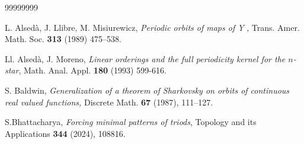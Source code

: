 \documentclass[12pt,reqno]{amsart}
\theoremstyle{definition}
\theoremstyle{remark}
\theoremstyle{assumption}
\numberwithin{equation}{section}
\begin{document}
	\begin{thebibliography}{99999999}
	
	
	 L. Alsedà, J. Llibre, M. Misiurewicz, \emph{Periodic orbits of maps of Y} , Trans. Amer. Math. Soc. \textbf{313} (1989) 475–538.
	
	
	
	
	

	  Ll. Alsed\`{a}, J. Moreno, \emph{Linear orderings and the full periodicity kernel for the $n$-star}, Math. Anal. Appl. \textbf{180} (1993) 599-616. 
	
	
	
	 S. Baldwin, \emph{Generalization of a theorem of
		Sharkovsky on orbits of continuous real valued functions,} Discrete
	Math. \textbf{67} (1987), 111--127.
	
	
	
	
	
	
	
	
	 S.Bhattacharya, \emph{Forcing minimal patterns of triods}, Topology and its Applications \textbf{344} (2024), 108816. 
	
	
	

\end{thebibliography}
\end{document}
